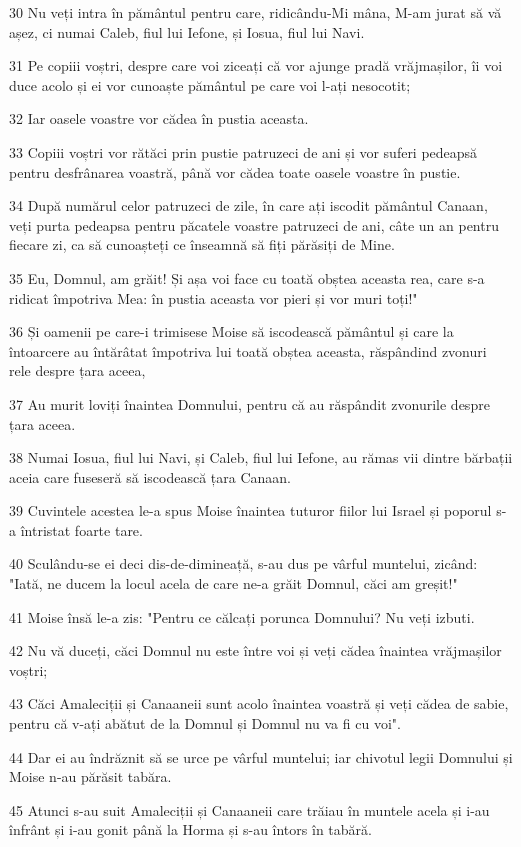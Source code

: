 \par 30 Nu veți intra în pământul pentru care, ridicându-Mi mâna, M-am jurat să vă așez, ci numai Caleb, fiul lui Iefone, și Iosua, fiul lui Navi.
\par 31 Pe copiii voștri, despre care voi ziceați că vor ajunge pradă vrăjmașilor, îi voi duce acolo și ei vor cunoaște pământul pe care voi l-ați nesocotit;
\par 32 Iar oasele voastre vor cădea în pustia aceasta.
\par 33 Copiii voștri vor rătăci prin pustie patruzeci de ani și vor suferi pedeapsă pentru desfrânarea voastră, până vor cădea toate oasele voastre în pustie.
\par 34 După numărul celor patruzeci de zile, în care ați iscodit pământul Canaan, veți purta pedeapsa pentru păcatele voastre patruzeci de ani, câte un an pentru fiecare zi, ca să cunoașteți ce înseamnă să fiți părăsiți de Mine.
\par 35 Eu, Domnul, am grăit! Și așa voi face cu toată obștea aceasta rea, care s-a ridicat împotriva Mea: în pustia aceasta vor pieri și vor muri toți!"
\par 36 Și oamenii pe care-i trimisese Moise să iscodească pământul și care la întoarcere au întărâtat împotriva lui toată obștea aceasta, răspândind zvonuri rele despre țara aceea,
\par 37 Au murit loviți înaintea Domnului, pentru că au răspândit zvonurile despre țara aceea.
\par 38 Numai Iosua, fiul lui Navi, și Caleb, fiul lui Iefone, au rămas vii dintre bărbații aceia care fuseseră să iscodească țara Canaan.
\par 39 Cuvintele acestea le-a spus Moise înaintea tuturor fiilor lui Israel și poporul s-a întristat foarte tare.
\par 40 Sculându-se ei deci dis-de-dimineață, s-au dus pe vârful muntelui, zicând: "Iată, ne ducem la locul acela de care ne-a grăit Domnul, căci am greșit!"
\par 41 Moise însă le-a zis: "Pentru ce călcați porunca Domnului? Nu veți izbuti.
\par 42 Nu vă duceți, căci Domnul nu este între voi și veți cădea înaintea vrăjmașilor voștri;
\par 43 Căci Amaleciții și Canaaneii sunt acolo înaintea voastră și veți cădea de sabie, pentru că v-ați abătut de la Domnul și Domnul nu va fi cu voi".
\par 44 Dar ei au îndrăznit să se urce pe vârful muntelui; iar chivotul legii Domnului și Moise n-au părăsit tabăra.
\par 45 Atunci s-au suit Amaleciții și Canaaneii care trăiau în muntele acela și i-au înfrânt și i-au gonit până la Horma și s-au întors în tabără.

